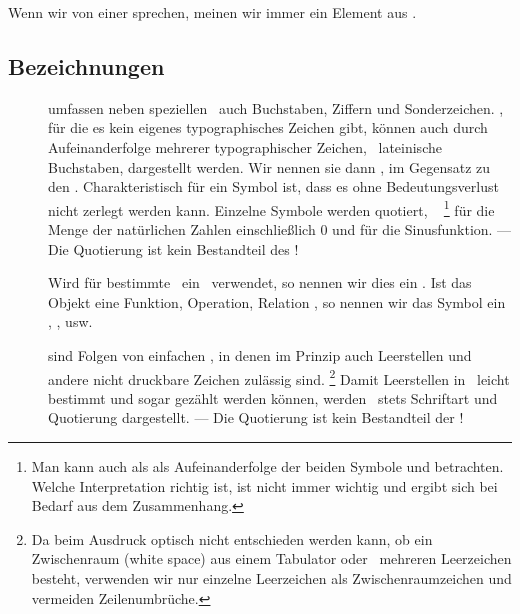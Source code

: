 Wenn wir von einer  sprechen, meinen wir immer ein Element aus \MtsINo.


\subsection{Bezeichnungen}%
\label {sub-Bezeichnungen}

\begin{description}

	\item [\Symbole] umfassen neben speziellen \Symbolen\ auch Buchstaben, Ziffern und Sonderzeichen.
	\Symbole, für die es kein eigenes typographisches Zeichen gibt, können auch durch Aufeinanderfolge mehrerer typographischer Zeichen, \textiAlg\ lateinische Buchstaben, dargestellt werden.
	Wir nennen sie dann , im Gegensatz zu den .
	Charakteristisch für ein Symbol ist, dass es ohne Bedeutungsverlust nicht zerlegt werden kann.
	Einzelne Symbole werden  quotiert, \textzB\ \chrqt{\MtsINo}%
	\footnote{%
		Man kann \chrqt{\MtsINo} auch als als Aufeinanderfolge der beiden Symbole \chrqt{\MtsIN} und  betrachten.
		Welche Interpretation richtig ist, ist nicht immer wichtig und ergibt sich bei Bedarf aus dem Zusammenhang.
	}
	für die Menge der natürlichen Zahlen einschließlich 0 und \chrqt{$\sin$} für die Sinusfunktion.
	--- Die Quotierung ist kein Bestandteil des \Symbols!

	Wird für bestimmte \Objekte\ ein \Symbol\ verwendet, so nennen wir dies ein .
	Ist das Objekt eine Funktion, Operation, Relation \textusw, so nennen wir das Symbol ein , ,  usw.

	\item [\Zeichenketten] sind Folgen von einfachen \Symbolen, in denen im Prinzip auch Leerstellen und andere nicht druckbare Zeichen zulässig sind.%
	\footnote{%
		Da beim Ausdruck optisch nicht entschieden werden kann, ob ein Zwischenraum (white space) aus einem Tabulator oder \textevtl\ mehreren Leerzeichen besteht, verwenden wir nur einzelne Leerzeichen als Zwischenraumzeichen und vermeiden Zeilenumbrüche.
	}
	Damit Leerstellen in \Zeichenketten\ leicht bestimmt und sogar gezählt werden können,
	werden \Zeichenketten\ stets  Schriftart und Quotierung dargestellt.
	--- Die Quotierung ist kein Bestandteil der \Zeichenkette!


\end{description}
